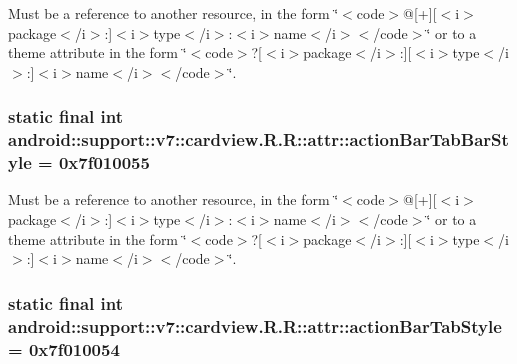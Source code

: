 Must be a reference to another resource, in the form \char`\"{}$<$code$>$@\mbox{[}+\mbox{]}\mbox{[}$<$i$>$package$<$/i$>$:\mbox{]}$<$i$>$type$<$/i$>$:$<$i$>$name$<$/i$>$$<$/code$>$\char`\"{} or to a theme attribute in the form \char`\"{}$<$code$>$?\mbox{[}$<$i$>$package$<$/i$>$:\mbox{]}\mbox{[}$<$i$>$type$<$/i$>$:\mbox{]}$<$i$>$name$<$/i$>$$<$/code$>$\char`\"{}. \hypertarget{classandroid_1_1support_1_1v7_1_1cardview_1_1_r_1_1attr_2fb14d152913b948142177c93e6681b2}{
\subsubsection[{actionBarTabBarStyle}]{\setlength{\rightskip}{0pt plus 5cm}static final int android::support::v7::cardview.R.R::attr::actionBarTabBarStyle = 0x7f010055}}
\label{classandroid_1_1support_1_1v7_1_1cardview_1_1_r_1_1attr_2fb14d152913b948142177c93e6681b2}


Must be a reference to another resource, in the form \char`\"{}$<$code$>$@\mbox{[}+\mbox{]}\mbox{[}$<$i$>$package$<$/i$>$:\mbox{]}$<$i$>$type$<$/i$>$:$<$i$>$name$<$/i$>$$<$/code$>$\char`\"{} or to a theme attribute in the form \char`\"{}$<$code$>$?\mbox{[}$<$i$>$package$<$/i$>$:\mbox{]}\mbox{[}$<$i$>$type$<$/i$>$:\mbox{]}$<$i$>$name$<$/i$>$$<$/code$>$\char`\"{}. \hypertarget{classandroid_1_1support_1_1v7_1_1cardview_1_1_r_1_1attr_1893cfce393a93c9f76fbf67c87762d8}{
\subsubsection[{actionBarTabStyle}]{\setlength{\rightskip}{0pt plus 5cm}static final int android::support::v7::cardview.R.R::attr::actionBarTabStyle = 0x7f010054}}
\label{classandroid_1_1support_1_1v7_1_1cardview_1_1_r_1_1attr_1893cfce393a93c9f76fbf67c87762d8}



